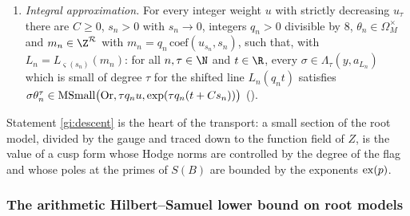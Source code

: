 \begin{proposition}
\begin{enumerate}[label=(\alph*)]
\ref{gi:frame}, then for every integer weight $u$ with strictly decreasing $u_\tau$, every $R\ge0$ and every
$s\in\deepstrmsmall(\mathrm{Or},u,R)$ there is $f\in\deepstrcusp(Z,G_u)$ with $\deepstrev(f)=\deepstrtr_u(s)$,
$\|f\|_{G_u,\sigma,z}\le dR$ for all good $\sigma$ and frames $z$ on $Z$, and
$v(f)\ge-v_\lambda(p)\,[p\in S(B)]\,\deepstrex(p)\,\|u\|_1$ for all primes $p$, all $\lambda\ni p$ and all
$v\in\mathcal V^{\mathrm{rec}}(\lambda)$ ().
\item\label{gi:approx} \emph{Integral approximation.} For every integer weight $u$ with strictly decreasing
$u_\tau$ there are $C\ge0$, $s_n>0$ with $s_n\to0$, integers $q_n>0$ divisible by $8$, $\theta_n\in\Omega_M^\times$ and
$m_n\in\Z^{\mathcal R}$ with $m_n=q_n\,\mathrm{coef}(u_{s_n},s_n)$, such that, with
$L_n=L_{\varsigma(s_n)}(m_n)$: for all $n,\tau\in\N$ and $t\in\R$, every $\sigma\in\Lambda_\tau(y,a_{L_n})$ which is
small of degree $\tau$ for the shifted line $L_n(q_nt)$ satisfies
$\sigma\theta_n^\tau\in\operatorname{MSmall}\bigl(\mathrm{Or},\tau q_nu,\exp(\tau q_n(t+Cs_n))\bigr)$
().
\end{enumerate}
\end{proposition}

Statement \ref{gi:descent} is the heart of the transport: a small section of the root model, divided by the gauge and
traced down to the function field of $Z$, is the value of a cusp form whose Hodge norms are controlled by the
degree of the flag and whose poles at the primes of $S(B)$ are bounded by the exponents $\operatorname{ex}(p)$.

\subsubsection*{The arithmetic Hilbert--Samuel lower bound on root models}

